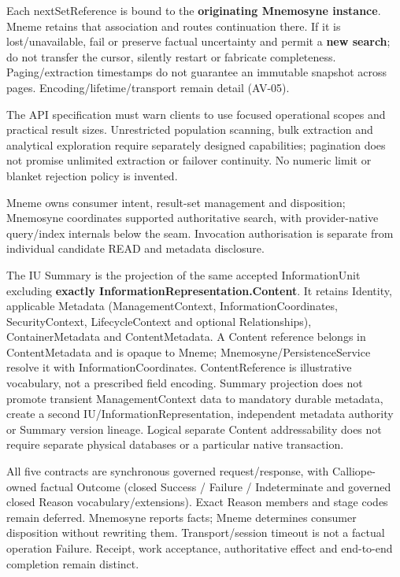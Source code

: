 Each nextSetReference is bound to the \textbf{originating Mnemosyne instance}. Mneme retains that association and routes continuation there. If it is lost/unavailable, fail or preserve factual uncertainty and permit a \textbf{new search}; do not transfer the cursor, silently restart or fabricate completeness. Paging/extraction timestamps do not guarantee an immutable snapshot across pages. Encoding/lifetime/transport remain detail (AV-05).



The API specification must warn clients to use focused operational scopes and practical result sizes. Unrestricted population scanning, bulk extraction and analytical exploration require separately designed capabilities; pagination does not promise unlimited extraction or failover continuity. No numeric limit or blanket rejection policy is invented.



Mneme owns consumer intent, result-set management and disposition; Mnemosyne coordinates supported authoritative search, with provider-native query/index internals below the seam. Invocation authorisation is separate from individual candidate READ and metadata disclosure.



The IU Summary is the projection of the same accepted InformationUnit excluding \textbf{exactly InformationRepresentation.Content}. It retains Identity, applicable Metadata (ManagementContext, InformationCoordinates, SecurityContext, LifecycleContext and optional Relationships), ContainerMetadata and ContentMetadata. A Content reference belongs in ContentMetadata and is opaque to Mneme; Mnemosyne/PersistenceService resolve it with InformationCoordinates. ContentReference is illustrative vocabulary, not a prescribed field encoding. Summary projection does not promote transient ManagementContext data to mandatory durable metadata, create a second IU/InformationRepresentation, independent metadata authority or Summary version lineage. Logical separate Content addressability does not require separate physical databases or a particular native transaction.



All five contracts are synchronous governed request/response, with Calliope-owned factual Outcome (closed Success / Failure / Indeterminate and governed closed Reason vocabulary/extensions). Exact Reason members and stage codes remain deferred. Mnemosyne reports facts; Mneme determines consumer disposition without rewriting them. Transport/session timeout is not a factual operation Failure. Receipt, work acceptance, authoritative effect and end-to-end completion remain distinct.



